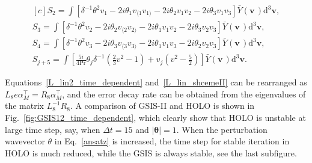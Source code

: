 \documentclass[onefignum,onetabnum]{siamart171218}
\newcommand{\lei}[1]{{\leavevmode\color{blue}#1}}
\begin{document}
\begin{equation}\label{L_lin_shcemeII}
\begin{aligned}[c]
S_2=\int\left[{\delta^{-1}}{\theta}^2{}{v}_1
-2i\theta_1v_{\langle{1}}v_{1\rangle}-2i\theta_2{v}_1{v}_2-2i\theta_3{v}_1{v}_3\right]\bar{Y}(\bm{{v}}\,)\mathrm{d}^3\bm{{v}}, \\
S_3=\int\left[{\delta^{-1}}{\theta}^2{}{v}_2
-2i\theta_2v_{\langle{2}}v_{2\rangle}-2i\theta_1{v}_1{v}_2-2i\theta_3{v}_2{v}_3\right]\bar{Y}(\bm{{v}}\,)\mathrm{d}^3\bm{{v}}, \\
S_4=\int\left[{\delta^{-1}}{\theta}^2{}{v}_3
-2i\theta_3v_{\langle{3}}v_{3\rangle}-2i\theta_1{v}_1{v}_3-2i\theta_2{v}_2{v}_3\right]\bar{Y}(\bm{{v}}\,)\mathrm{d}^3\bm{{v}}, \\
S_{j+5}=\int\left[\frac{5i}{4\text{Pr}}\theta_j{\delta^{-1}}{}\left(\frac{2}{3}{v}^2-1\right)+{v}_j\left({v}^2-\frac{5}{2}\right)\right]\bar{Y}(\bm{{v}}\,)\mathrm{d}^3\bm{{v}}.
\end{aligned} 
\end{equation}



Equations~\eqref{L_lin2_time_dependent} and~\eqref{L_lin_shcemeII} can be rearranged as
$L_8e\alpha_M^\top=R_8\alpha_M^\top$,
and the error decay rate can be obtained from the eigenvalues of the matrix $L_8^{-1}R_8$. A comparison of GSIS-II and HOLO is shown in Fig.~\ref{fig:GSIS12_time_dependent}, which clearly show that HOLO is unstable at large time step, say, when $\Delta{t}=15$ and $|\bm{\theta}|=1$. When the perturbation wavevector $\theta$ in Eq.~\eqref{ansatz} is increased, the time step for stable iteration in HOLO is much reduced, while the GSIS is always stable, see the last subfigure. 


%
\end{document}
